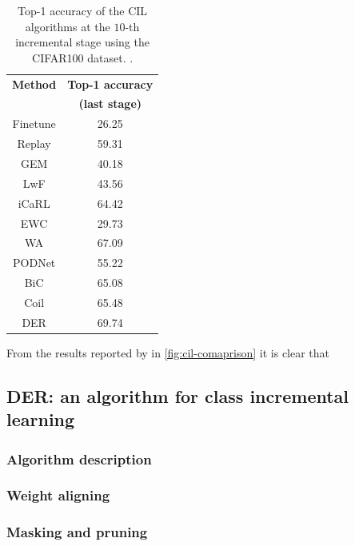 \begin{table}
    \centering
    \begin{tabular}{c c} 
     \hline
     \textbf{Method} & \textbf{Top-1 accuracy} \\
     & \textbf{(last stage)}\\
     \hline
     Finetune & 26.25 \\ 
    Replay & 59.31 \\ 
    GEM & 40.18 \\ 
    LwF & 43.56 \\ 
    iCaRL & 64.42 \\ 
    EWC & 29.73 \\ 
    WA & 67.09 \\ 
    PODNet & 55.22 \\ 
    BiC & 65.08 \\ 
    Coil & 65.48 \\ 
    DER & 69.74 \\ 

     \hline
    \end{tabular}
    \caption{Top-1 accuracy of the CIL algorithms at the $10$-th incremental stage using the CIFAR100 dataset. \cite{zhou2021pycil}.}
    \label{table:cil-results}
    \end{table}

From the results reported by \cite{zhou2021pycil} in \autoref{fig:cil-comaprison} it is clear that 


\subsection{DER: an algorithm for class incremental learning}
\subsubsection{Algorithm description}
\subsubsection{Weight aligning}
\subsubsection{Masking and pruning}
